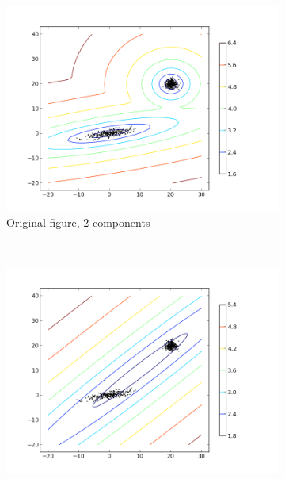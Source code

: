 \documentclass{article}
\begin{document}
    \begin{figure}
            \centering
            \begin{subfigure}[h]{0.3\textwidth}
                    \centering
                    \includegraphics[width=\textwidth]{gmm_original.png}
                    \caption{Original figure, 2 components}
                    \label{fig:orig}
            \end{subfigure}%
            ~ %
            \begin{subfigure}[h]{0.3\textwidth}
                    \centering
                    \includegraphics[width=\textwidth]{gmm_comp1.png}

\end{subfigure}
\end{figure}
\end{document}
